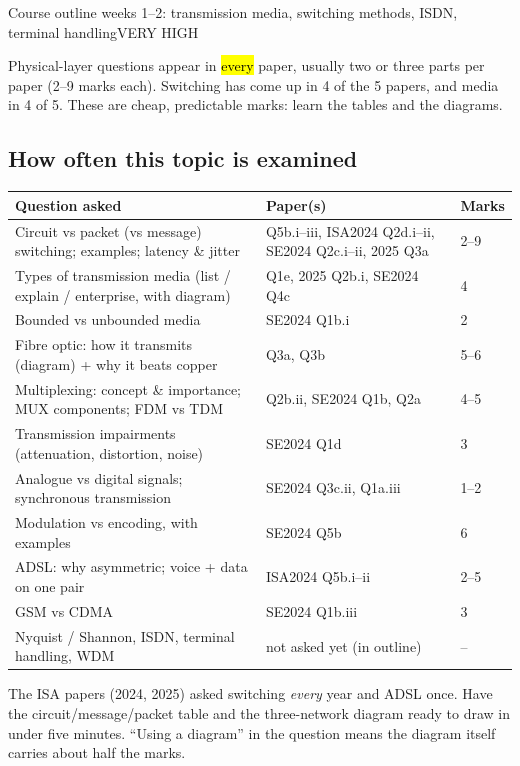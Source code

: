 \documentclass[10pt]{article}
\begin{document}
  {Course outline weeks 1--2: transmission media, switching methods, ISDN, terminal handling}{VERY HIGH}

Physical-layer questions appear in \hl{every} paper, usually two or three parts per paper (2--9 marks each).
Switching has come up in 4 of the 5 papers, and media in 4 of 5. These are cheap, predictable marks: learn the tables and the diagrams.

\subsection*{How often this topic is examined}
\begin{tabularx}{\linewidth}{@{}X>{\raggedright\arraybackslash}p{4.6cm}l@{}}
\toprule
\textbf{Question asked} & \textbf{Paper(s)} & \textbf{Marks}\\
\midrule
Circuit vs packet (vs message) switching; examples; latency \& jitter & 2023 Q5b.i--iii, ISA2024 Q2d.i--ii, SE2024 Q2c.i--ii, 2025 Q3a & 2--9\\
Types of transmission media (list / explain / enterprise, with diagram) & 2023 Q1e, 2025 Q2b.i, SE2024 Q4c & 4\\
Bounded vs unbounded media & SE2024 Q1b.i & 2\\
Fibre optic: how it transmits (diagram) + why it beats copper & 2023 Q3a, Q3b & 5--6\\
Multiplexing: concept \& importance; MUX components; FDM vs TDM & 2025 Q2b.ii, SE2024 Q1b, Q2a & 4--5\\
Transmission impairments (attenuation, distortion, noise) & SE2024 Q1d & 3\\
Analogue vs digital signals; synchronous transmission & SE2024 Q3c.ii, Q1a.iii & 1--2\\
Modulation vs encoding, with examples & SE2024 Q5b & 6\\
ADSL: why asymmetric; voice + data on one pair & ISA2024 Q5b.i--ii & 2--5\\
GSM vs CDMA & SE2024 Q1b.iii & 3\\
Nyquist / Shannon, ISDN, terminal handling, WDM & not asked yet (in outline) & --\\
\bottomrule
\end{tabularx}

\begin{examtip}
The ISA papers (2024, 2025) asked switching \emph{every} year and ADSL once. Have the circuit/message/packet table and the three-network diagram
ready to draw in under five minutes. ``Using a diagram'' in the question means the diagram itself carries about half the marks.
\end{examtip}
\end{document}
